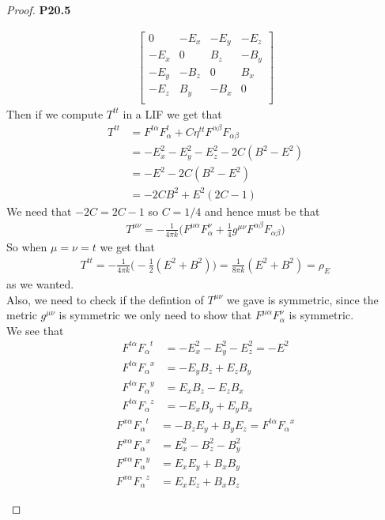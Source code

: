 \documentclass[11pt]{article}
\theoremstyle{definition}
\begin{document}
\begin{proof}{\textbf{P20.5}}
\begin{itemize}
\begin{align*}
\begin{bmatrix}
        0 & -E_x & -E_y & -E_z\\
        -E_x & 0 & B_z & -B_y\\ 
        -E_y & -B_z & 0 & B_x\\ 
        -E_z & B_y & -B_x & 0\\ 
    \end{bmatrix}
\end{align*}
Then if we compute $T^{tt}$ in a LIF we get that
\begin{align*}
    T^{tt}
    &= F^{t\alpha}F^{t}_{\alpha} + C\eta^{tt}F^{\alpha\beta}F_{\alpha\beta}\\
    &= -E_x^2 - E_y^2 - E_z^2  -2C(B^2 - E^2)\\
    &= -E^2 -2C(B^2 - E^2)\\
    &= -2CB^2 + E^2(2C - 1)
\end{align*}
We need that $-2C = 2C - 1$ so $C = 1/4$ and hence must be that
\begin{align*}
    T^{\mu\nu} = -\frac{1}{4\pi k} \bigg(F^{\mu\alpha}F^{\nu}_{\alpha}
    + \frac{1}{4}g^{\mu\nu}F^{\alpha\beta}F_{\alpha\beta}\bigg)
\end{align*}
So when $\mu = \nu = t$ we get that
\begin{align*}
    T^{tt} = -\frac{1}{4\pi k} \bigg(-\frac{1}{2}(E^2 + B^2)\bigg)
    = \frac{1}{8\pi k}(E^2 + B^2) = \rho_E
\end{align*}
as we wanted.\\
Also, we need to check if the defintion of $T^{\mu\nu}$ we gave is symmetric,
since the metric $g^{\mu\nu}$ is symmetric we only need to show that
$F^{\mu\alpha}F^{\nu}_{\alpha}$ is symmetric.\\
We see that
\begin{align*}
    F^{t\alpha}{F_{\alpha}}^{t} &= -E_x^2 -E_y^2 - E_z^2 = -E^2\\
    F^{t\alpha}{F_{\alpha}}^{x} &= -E_yB_z + E_zB_y\\
    F^{t\alpha}{F_{\alpha}}^{y} &= E_xB_z - E_zB_x\\
    F^{t\alpha}{F_{\alpha}}^{z} &= -E_xB_y + E_yB_x
\end{align*}
\begin{align*}
    F^{x\alpha}{F_{\alpha}}^{t} &= -B_zE_y + B_yE_z = F^{t\alpha}{F_\alpha}^{x}\\
    F^{x\alpha}{F_{\alpha}}^{x} &= E_x^2 - B_z^2 - B_y^2\\
    F^{x\alpha}{F_{\alpha}}^{y} &= E_xE_y + B_xB_y\\
    F^{x\alpha}{F_{\alpha}}^{z} &= E_xE_z + B_xB_z

\end{align*}
\end{itemize}
\end{proof}
\end{document}
